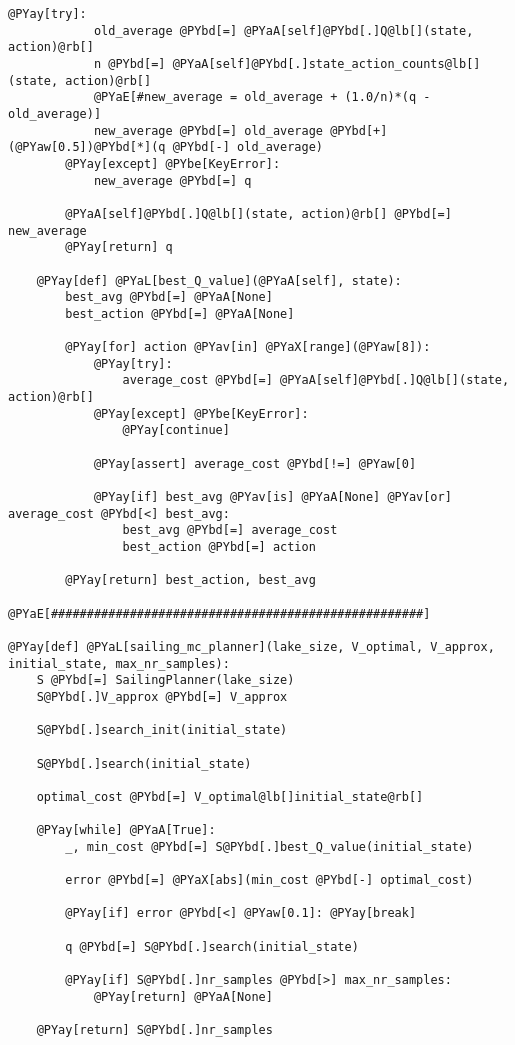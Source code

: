 \begin{Verbatim}[commandchars=@\[\]]
        @PYay[try]:
            old_average @PYbd[=] @PYaA[self]@PYbd[.]Q@lb[](state, action)@rb[]
            n @PYbd[=] @PYaA[self]@PYbd[.]state_action_counts@lb[](state, action)@rb[]
            @PYaE[#new_average = old_average + (1.0/n)*(q - old_average)]
            new_average @PYbd[=] old_average @PYbd[+] (@PYaw[0.5])@PYbd[*](q @PYbd[-] old_average)
        @PYay[except] @PYbe[KeyError]:
            new_average @PYbd[=] q

        @PYaA[self]@PYbd[.]Q@lb[](state, action)@rb[] @PYbd[=] new_average
        @PYay[return] q

    @PYay[def] @PYaL[best_Q_value](@PYaA[self], state):
        best_avg @PYbd[=] @PYaA[None]
        best_action @PYbd[=] @PYaA[None]

        @PYay[for] action @PYav[in] @PYaX[range](@PYaw[8]):
            @PYay[try]:
                average_cost @PYbd[=] @PYaA[self]@PYbd[.]Q@lb[](state, action)@rb[]
            @PYay[except] @PYbe[KeyError]:
                @PYay[continue]

            @PYay[assert] average_cost @PYbd[!=] @PYaw[0]

            @PYay[if] best_avg @PYav[is] @PYaA[None] @PYav[or] average_cost @PYbd[<] best_avg:
                best_avg @PYbd[=] average_cost
                best_action @PYbd[=] action

        @PYay[return] best_action, best_avg

@PYaE[####################################################]

@PYay[def] @PYaL[sailing_mc_planner](lake_size, V_optimal, V_approx, initial_state, max_nr_samples):
    S @PYbd[=] SailingPlanner(lake_size)
    S@PYbd[.]V_approx @PYbd[=] V_approx

    S@PYbd[.]search_init(initial_state)

    S@PYbd[.]search(initial_state)

    optimal_cost @PYbd[=] V_optimal@lb[]initial_state@rb[]

    @PYay[while] @PYaA[True]:
        _, min_cost @PYbd[=] S@PYbd[.]best_Q_value(initial_state)

        error @PYbd[=] @PYaX[abs](min_cost @PYbd[-] optimal_cost)

        @PYay[if] error @PYbd[<] @PYaw[0.1]: @PYay[break]

        q @PYbd[=] S@PYbd[.]search(initial_state)

        @PYay[if] S@PYbd[.]nr_samples @PYbd[>] max_nr_samples:
            @PYay[return] @PYaA[None]

    @PYay[return] S@PYbd[.]nr_samples
\end{Verbatim}
